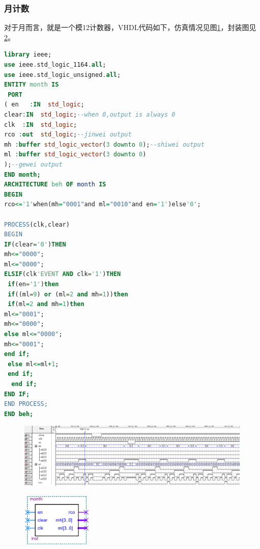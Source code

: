 \documentclass[12pt]{article}
\begin{document}
\subsubsection{月计数}
对于月而言，就是一个模12计数器，VHDL代码如下，仿真情况见图\ref{fig:fzmonth}，封装图见\ref{fig:fengzhuangmonth}。
\begin{lstlisting}[language=VHDL]
library ieee;
use ieee.std_logic_1164.all;
use ieee.std_logic_unsigned.all;
ENTITY month IS 
 PORT
( en   :IN  std_logic;
clear:IN  std_logic;--when 0,output is always 0
clk  :IN  std_logic;
rco :out  std_logic;--jinwei output
mh :buffer std_logic_vector(3 downto 0);--shiwei output
ml :buffer std_logic_vector(3 downto 0)
);--gewei output
END month;
ARCHITECTURE beh OF month IS
BEGIN
rco<='1'when(mh="0001"and ml="0010"and en='1')else'0'; 

PROCESS(clk,clear)
BEGIN
IF(clear='0')THEN
mh<="0000";
ml<="0000";
ELSIF(clk'EVENT AND clk='1')THEN
 if(en='1')then
 if((ml=9) or (ml=2 and mh=1))then
 if(ml=2 and mh=1)then
ml<="0001";
mh<="0000";
else ml<="0000";
mh<="0001";
end if;
 else ml<=ml+1;
 end if;
  end if;
END IF;
END PROCESS;
END beh;
\end{lstlisting}
\begin{figure}[hp]
	\centering  
	\includegraphics[width=\textwidth]{picture/fzmonth.png} 
	\caption{}
	\label{fig:fzmonth}   
\end{figure}
\begin{figure}[hp]
	\centering  
	\includegraphics[width=0.3\textwidth]{picture/monthfz.png} 
	\caption{}
	\label{fig:fengzhuangmonth}   
\end{figure}
\end{document}
